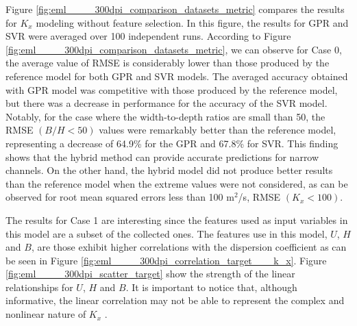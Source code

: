 \documentclass[a4paper,12pt, english]{article}
\begin{document}
Figure \ref{fig:eml____300dpi_comparison_datasets_metric}
compares the results for $K_x$ modeling without feature selection.
In this figure, the results for GPR and SVR were averaged over 100 independent runs.
%  
According to Figure \ref{fig:eml____300dpi_comparison_datasets_metric}, we can observe for Case 0, the average value of RMSE is considerably lower than those produced by the reference model for both GPR and SVR models. The averaged accuracy obtained with GPR model was competitive with those produced by the reference model, but there was a decrease in performance for the accuracy of the SVR model. Notably, for the case where the width-to-depth ratios are small than 50, the RMSE $(B/H<50)$ values were remarkably better than the reference model, representing a decrease of 64.9\% for the GPR and 67.8\% for SVR. This finding shows that the hybrid method can provide accurate predictions for narrow channels. 
On the other hand, the hybrid model did not produce better results than the reference model when the extreme values were not considered, as can be observed for root mean squared errors less than 100 m$^2$/s, RMSE $ (K_x <100)$. 

The results for Case 1 are interesting since the features used as input variables in this model are a subset of the collected ones.  The features use in this model, $U$, $H$ and $B$, are those exhibit  higher correlations with the dispersion coefficient as can be seen in Figure \ref{fig:eml____300dpi_correlation_target___k_x}. Figure \ref{fig:eml____300dpi_scatter_target} show the strength of the linear relationships for $U$, $H$ and $B$.
It is important to notice that, although informative, the linear correlation may not be able to represent the complex and nonlinear nature of $K_x$ \cite{noori2016reliable}. 
\end{document}

